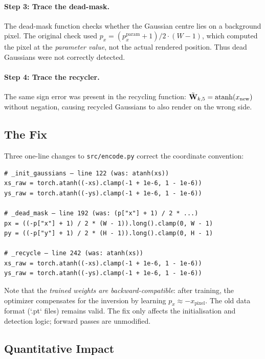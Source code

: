 \paragraph{Step 3: Trace the dead-mask.}
The dead-mask function checks whether the Gaussian centre lies on a background pixel.
The original check used $p_x = (p_x^{\mathrm{param}} + 1) / 2 \cdot (W-1)$,
which computed the pixel at the \emph{parameter value}, not the actual rendered
position.  Thus dead Gaussians were not correctly detected.

\paragraph{Step 4: Trace the recycler.}
The same sign error was present in the recycling function:
$\tilde{\mathbf{W}}_{k,5} = \operatorname{atanh}(x_\text{new})$ without negation,
causing recycled Gaussians to also render on the wrong side.

\subsection{The Fix}
\label{sec:fix}

Three one-line changes to \texttt{src/encode.py} correct the coordinate convention:

\medskip
\begin{lstlisting}[caption={Three-line fix in \texttt{src/encode.py}.}]
# _init_gaussians — line 122 (was: atanh(xs))
xs_raw = torch.atanh((-xs).clamp(-1 + 1e-6, 1 - 1e-6))
ys_raw = torch.atanh((-ys).clamp(-1 + 1e-6, 1 - 1e-6))

# _dead_mask — line 192 (was: (p["x"] + 1) / 2 * ...)
px = ((-p["x"] + 1) / 2 * (W - 1)).long().clamp(0, W - 1)
py = ((-p["y"] + 1) / 2 * (H - 1)).long().clamp(0, H - 1)

# _recycle — line 242 (was: atanh(xs))
xs_raw = torch.atanh((-xs).clamp(-1 + 1e-6, 1 - 1e-6))
ys_raw = torch.atanh((-ys).clamp(-1 + 1e-6, 1 - 1e-6))
\end{lstlisting}

\medskip
\noindent
Note that the \emph{trained weights are backward-compatible}: after training,
the optimizer compensates for the inversion by learning $p_x \approx -x_\text{pixel}$.
The old data format (`.pt` files) remains valid.
The fix only affects the initialisation and detection logic; forward passes are
unmodified.

\subsection{Quantitative Impact}

